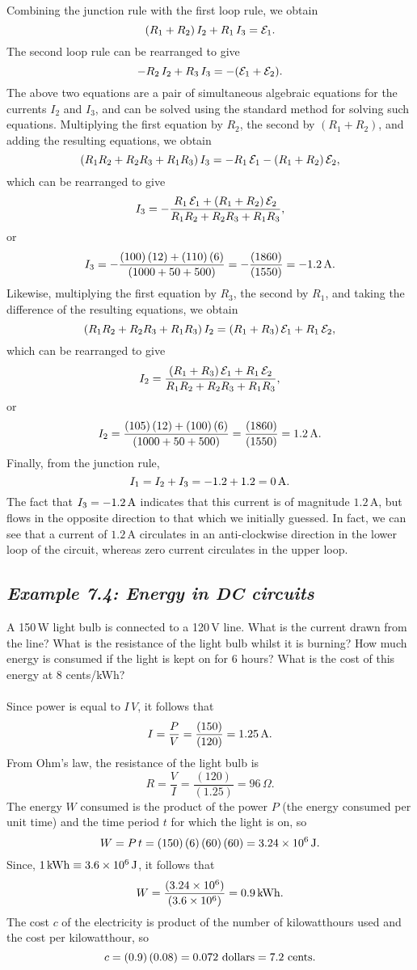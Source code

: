 Combining the junction rule with the first loop rule, we obtain
$$
(R_1+R_2)\,I_2 + R_1\,I_3 = {\cal E}_1.
$$
The second loop rule can be rearranged to give
$$
-R_2\,I_2 +R_3\,I_3 = -({\cal E}_1 +{\cal E}_2).
$$
The above two equations are a pair of simultaneous algebraic equations
for the currents $I_2$ and $I_3$, and can be solved using the standard method
for solving such equations.
Multiplying the first equation by $R_2$, the second by $(R_1+R_2)$, and adding
the resulting equations, we obtain
$$
(R_1 R_2 + R_2 R_3+ R_1 R_3)\,I_3 = - R_1\,{\cal E}_1 -
(R_1+R_2)\,{\cal E}_2,
$$
which can be rearranged to give
$$
I_3 = - \frac{ R_1\,{\cal E}_1 +
(R_1+R_2)\,{\cal E}_2}{R_1 R_2 + R_2 R_3+ R_1 R_3},
$$
or
$$
I_3 = - \frac{ (100)\,(12)+(110)\,(6)}{(1000+50 + 500)} =- \frac{(1860)}{(1550)}=
-1.2\,{\rm A}.
$$
Likewise, multiplying the first equation by $R_3$, the second by $R_1$, and
taking the difference of the resulting equations, we obtain
$$
(R_1 R_2 + R_2 R_3+ R_1 R_3)\,I_2 = (R_1+R_3)\,{\cal E}_1 
+ R_1\,{\cal E}_2,
$$
which can be rearranged to give
$$
I_2 = \frac{ (R_1+R_3)\,{\cal E}_1 
+ R_1\,{\cal E}_2}{R_1 R_2 + R_2 R_3+ R_1 R_3},
$$
or
$$
I_2 = \frac{ (105)\,(12) + (100)\,(6) }{ (1000+50 + 500)} = \frac{(1860)}{(1550)}
= 1.2\,{\rm A}.
$$
Finally, from the junction rule,
$$
I_1 = I_2 + I_3 = -1.2+1.2 = 0\,{\rm A}.
$$
The fact that $I_3=-1.2\,{\rm A}$ indicates that this current is of magnitude
$1.2$\,A, but flows in the opposite direction to that which we initially
guessed. In fact, we can see that a current of $1.2$\,A circulates in an
anti-clockwise direction in the lower loop of the circuit, whereas zero current
circulates in the upper loop. 

\subsection*{\em Example 7.4: Energy in DC circuits}
  A 150\,W light bulb is connected to a 120\,V line.
What is the current drawn from the line? What is the resistance of the light
bulb whilst it is burning? How much energy is consumed if the light is
kept on for 6 hours? What is the cost of this energy at 8 cents/kWh?\\
~\\
 Since power is equal to $I\,V$, it follows that
$$
I = \frac{P}{V} = \frac{(150)}{(120)} = 1.25\,{\rm A}.
$$
From Ohm's law, the resistance of the light bulb is
$$
R = \frac{V}{I} = \frac{(120)}{(1.25)} = 96 \,\Omega.
$$
The energy $W$ consumed is the product of the power $P$ (the energy consumed per
unit time) and the time period $t$ for which the light is on, so
$$
W = P\,t = (150)\,(6)\,(60)\,(60) = 3.24\times 10^6\,{\rm J}.
$$
Since, $1\,{\rm kWh} \equiv 3.6\times 10^6\,{\rm J}$, it
follows that
$$
W = \frac{(3.24\times 10^6)}{(3.6\times 10^6)} = 0.9\,{\rm kWh}.
$$
The cost $c$ of the electricity is product of the number of kilowatthours used
and the cost per kilowatthour, so
$$
c = (0.9)\,(0.08) = 0.072\,\,{\rm dollars} = 7.2\,\,{\rm cents}.
$$

